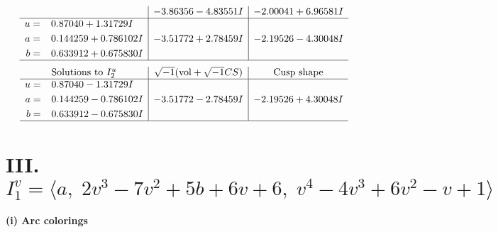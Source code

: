 \documentclass[1p]{elsarticle_modified}
\theoremstyle{definition}
\newcommand{\I}{\sqrt{-1}}
\begin{document}
$$\begin{array}{c|c|c}
 & -3.86356 - 4.83551 I & -2.00041 + 6.96581 I \\ \hline\begin{aligned}
u &= \phantom{-}0.87040 + 1.31729 I \\
a &= \phantom{-}0.144259 + 0.786102 I \\
b &= \phantom{-}0.633912 + 0.675830 I\end{aligned}
 & -3.51772 + 2.78459 I & -2.19526 - 4.30048 I\\
 \hline 
 \end{array}$$\newpage$$\begin{array}{c|c|c}  
\text{Solutions to }I^u_{2}& \I (\text{vol} + \sqrt{-1}CS) & \text{Cusp shape}\\
 \hline 
\begin{aligned}
u &= \phantom{-}0.87040 - 1.31729 I \\
a &= \phantom{-}0.144259 - 0.786102 I \\
b &= \phantom{-}0.633912 - 0.675830 I\end{aligned}
 & -3.51772 - 2.78459 I & -2.19526 + 4.30048 I\\
 \hline 
 \end{array}$$\newpage\newpage\renewcommand{\arraystretch}{1}
\centering \section*{III. $I^v_{1}= \langle a,\;2 v^3-7 v^2+5 b+6 v+6,\;v^4-4 v^3+6 v^2- v+1 \rangle$}
\flushleft \textbf{(i) Arc colorings}\\
\end{document}
